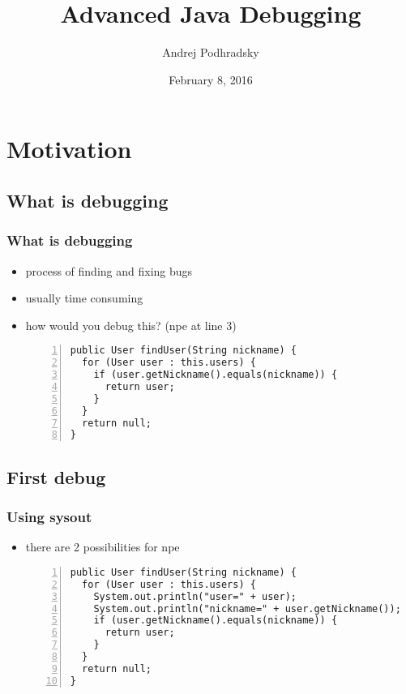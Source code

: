 \documentclass{beamer}
\begin{document}
\title{Advanced Java Debugging}   
\author{Andrej Podhradsky}
\date{February 8, 2016} 



\frame{\titlepage} 


\section{Motivation}

\subsection{What is debugging}
\begin{frame}[fragile]
\frametitle{What is debugging}
\begin{itemize}
\item process of finding and fixing bugs
\item usually time consuming
\item how would you debug this? (npe at line 3)
\vspace{0.2cm}
\begin{lstlisting}[numbers=left]
public User findUser(String nickname) {
  for (User user : this.users) {
    if (user.getNickname().equals(nickname)) {
      return user;
    }
  }
  return null;
}
\end{lstlisting}
\end{itemize}
\end{frame}


\subsection{First debug}
\begin{frame}[fragile]
\frametitle{Using sysout}
\begin{itemize}
\item there are 2 possibilities for npe
\vspace{0.2cm}
\begin{lstlisting}[numbers=left]
public User findUser(String nickname) {
  for (User user : this.users) {
    System.out.println("user=" + user);
    System.out.println("nickname=" + user.getNickname());
    if (user.getNickname().equals(nickname)) {
      return user;
    }
  }
  return null;
}
\end{lstlisting}
\end{itemize}
\end{frame}
\end{document}

